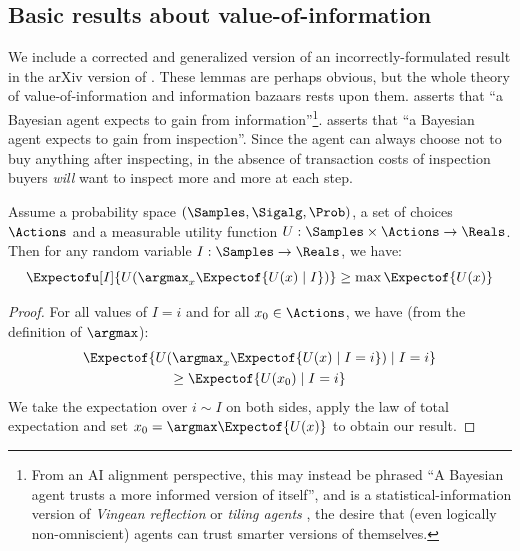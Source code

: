 \begin{subappendices}

\section{Basic results about value-of-information}
\label{infonomy:sec:thms}

We include a corrected and generalized version of an incorrectly-formulated result in the arXiv version of \citet{weissRedesigningInformationMarkets2024}. These lemmas are perhaps obvious, but the whole theory of value-of-information and information bazaars rests upon them.  asserts that ``a Bayesian agent expects to gain from information''\footnote{From an AI alignment perspective, this may instead be phrased ``A Bayesian agent trusts a more informed version of itself'', and is a statistical-information version of \emph{Vingean reflection} or \emph{tiling agents} \citep{vingeanReflection}, the desire that (even logically non-omniscient) agents can trust smarter versions of themselves.}.  asserts that ``a Bayesian agent expects to gain from inspection''. Since the agent can always choose not to buy anything after inspecting, in the absence of transaction costs of inspection buyers \emph{will} want to inspect more and more at each step. %

\begin{lemma}
Assume a probability space $(\Samples,\Sigalg,\Prob)$, a set of choices $\Actions$ and a measurable utility function $U:\Samples\times\Actions\to\Reals$. Then for any random variable $I:\Samples\to\Reals$, we have:
\begin{equation*}
\Expectofu[I]{U(\argmax_x\Expectof{U(x)\mid I})} \ge
\max\Expectof{U(x)}
\end{equation*}
\label{infonomy:lem:voinf}
\end{lemma}
\begin{proof}
For all values of $I=i$ and for all $x_0\in\Actions$, we have (from the definition of $\argmax$):
\begin{multline*}
\Expectof{U(\argmax_x \Expectof{U(x)\mid I=i})\mid I=i} \\
\ge \Expectof{U(x_0)\mid I=i}
\end{multline*}
We take the expectation over $i\sim I$ on both sides, apply the law of total expectation and set $x_0=\argmax\Expectof{U(x)}$ to obtain our result.
\end{proof}


\end{subappendices}
